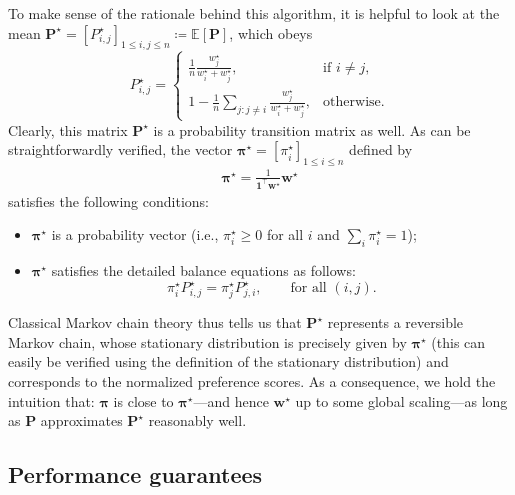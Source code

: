 To make sense of the rationale behind this algorithm, it is helpful to
look at the mean $\bm{P}^{\star} =[P_{i,j}^{\star}]_{1\leq i,j\leq n} \coloneqq\mathbb{E}[\bm{P}]$, which obeys
%
\begin{equation}
P_{i,j}^{\star}=\begin{cases}
	\frac{1}{n} \frac{w_j^{\star}}{w_i^{\star}+w_j^{\star}}, & \text{if }i\neq j,\\
	1- \frac{1}{n}  \sum_{j:j\neq i}\frac{w_j^{\star}}{w_i^{\star}+w_j^{\star}}, & \text{otherwise}.
\end{cases}\label{defn:ranking-P-star}
\end{equation}
%
Clearly, this matrix $\bm{P}^{\star}$ is a probability transition matrix as well.
As can be straightforwardly verified, the vector $\bm{\pi}^{\star}=[\pi_{i}^{\star}]_{1\leq i\leq n}$ defined by
%
\begin{align}
	\bm{\pi}^{\star} = \frac{1}{\bm{1}^{\top}\bm{w}^{\star}} \bm{w}^{\star}
	\label{defn:pi-i-star-BTL}
\end{align}
%
satisfies the following conditions:
%
\begin{itemize}
	\item $\bm{\pi}^{\star}$ is a probability vector (i.e., $\pi_i^{\star}\geq 0$ for all $i$ and $\sum_i\pi_i^{\star}=1$);
	\item $\bm{\pi}^{\star}$ satisfies the detailed balance equations as follows:
%
\[
	\pi_{i}^{\star}P_{i,j}^{\star} = \pi_{j}^{\star}P_{j,i}^{\star},\qquad\text{for all }(i,j).
\]
%
\end{itemize}
%
Classical Markov chain theory \citep{bremaud2013markov} thus tells us that
$\bm{P}^{\star}$ represents a reversible Markov chain, whose stationary distribution is precisely given by $\bm{\pi}^{\star}$ (this can easily be verified using the definition of the stationary distribution) and corresponds to the normalized preference scores.
As a consequence, we hold the intuition that:  $\bm{\pi}$ is close to $\bm{\pi}^{\star}$---and hence $\bm{w}^{\star}$ up to some global scaling---as long as $\bm{P}$ approximates $\bm{P}^{\star}$ reasonably well.






\subsection{Performance guarantees}
\label{sec:theory-ranking}


